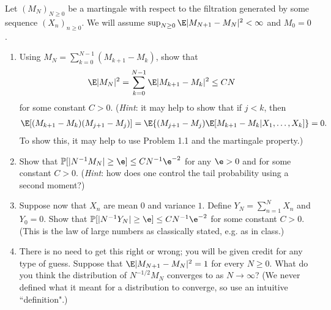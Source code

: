 \documentclass[12pt,reqno]{amsart}
\theoremstyle{definition}
\theoremstyle{remark}
\numberwithin{equation}{section}
\begin{document}
Let $(M_{N})_{N\geq0}$ be a martingale with respect to the filtration generated by some sequence $(X_{n})_{n\geq0}$. We will assume $\sup_{N\geq0}\E|M_{N+1}-M_{N}|^{2}<\infty$ and $M_{0}=0$.
\begin{enumerate}
\item Using $M_{N}=\sum_{k=0}^{N-1}(M_{k+1}-M_{k})$, show that 
%
\begin{align*}
\E|M_{N}|^{2}&=\sum_{k=0}^{N-1}\E|M_{k+1}-M_{k}|^{2}\leq CN
\end{align*}
%
for some constant $C>0$. (\emph{Hint}: it may help to show that if $j<k$, then 
%
\begin{align*}
\E[(M_{k+1}-M_{k})(M_{j+1}-M_{j})]=\E\{(M_{j+1}-M_{j})\E[M_{k+1}-M_{k}|X_{1},\ldots,X_{k}]\}=0.
\end{align*}
%
To show this, it may help to use Problem 1.1 and the martingale property.)
\item Show that $\mathbb{P}[|N^{-1}M_{N}|\geq\e]\leq CN^{-1}\e^{-2}$ for any $\e>0$ and for some constant $C>0$. (\emph{Hint}: how does one control the tail probability using a second moment?)
\item Suppose now that $X_{n}$ are mean $0$ and variance $1$. Define $Y_{N}=\sum_{n=1}^{N}X_{n}$ and $Y_{0}=0$. Show that $\mathbb{P}[|N^{-1}Y_{N}|\geq \e]\leq CN^{-1}\e^{-2}$ for some constant $C>0$. (This is the law of large numbers as classically stated, e.g. as in class.)
\item There is no need to get this right or wrong; you will be given credit for any type of guess. Suppose that $\E|M_{N+1}-M_{N}|^{2}=1$ for every $N\geq0$. What do you think the distribution of $N^{-1/2}M_{N}$ converges to as $N\to\infty$? (We never defined what it meant for a distribution to converge, so use an intuitive ``definition".) 
\end{enumerate}
\end{document}
